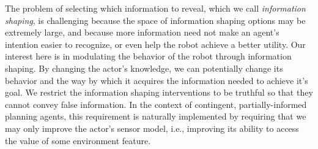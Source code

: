 The problem of selecting which information to reveal, which we call {\em information shaping}, is challenging because the space of information shaping options may be extremely large, and because more information need not make an agent's intention easier to recognize, or even help the robot achieve a better utility.
Our interest here is in modulating the behavior of the robot through information shaping. By changing the actor's knowledge, we can potentially change its behavior and the way by which it acquires the information needed to achieve it's goal.  We restrict the information shaping interventions to be truthful  so that they cannot convey false information.
In the context of contingent, partially-informed planning agents, this requirement is naturally implemented by requiring that we may only improve the actor's sensor model, i.e., improving its ability to  access the  value of some environment feature. 
